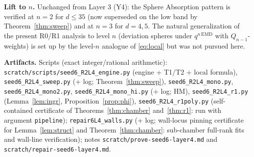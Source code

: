 \documentclass[11pt]{article}
\theoremstyle{definition}
\theoremstyle{remark}
\newcommand{\EMD}{\mathrm{EMD}}
\begin{document}
\textbf{Lift to $n$.} Unchanged from Layer 3 (Y4): the Sphere Absorption
pattern is verified at $n=2$ for $d\le35$ (now superseded on the low band by
Theorem~\ref{thm:sweep}) and at $n=3$ for $d=4,5$. The natural
generalization of the present R0/R1 analysis to level $n$ (deviation spheres
under $q^{n\,\EMD}$ with $Q_{n-1}$-weights) is set up by the level-$n$
analogue of \eqref{eq:local} but was not pursued here.

\medskip
\noindent\textbf{Artifacts.} Scripts (exact integer/rational arithmetic):
\texttt{scratch/scripts/seed6\_R2L4\_engine.py} (engine + T1/T2 + local
formula), \texttt{seed6\_R2L4\_sweep.py} (+ log; Theorem~\ref{thm:sweep}),
\texttt{seed6\_R2L4\_mono.py}, \texttt{seed6\_R2L4\_mono2.py},
\texttt{seed6\_R2L4\_mono\_hi.py} (+ log; HM),
\texttt{seed6\_R2L4\_r1.py} (Lemma~\ref{lem:ingr},
Proposition~\ref{prop:phi}),
\texttt{seed6\_R2L4\_r1poly.py} (self-contained certificate of
Theorems~\ref{thm:chamber} and~\ref{thm:r1}: run with argument
\texttt{pipeline}); \texttt{repair6L4\_walls.py} (+ log; wall-locus
pinning certificate for Lemma~\ref{lem:struct} and
Theorem~\ref{thm:chamber}: sub-chamber full-rank fits and wall-line
verification); notes \texttt{scratch/prove-seed6-layer4.md} and
\texttt{scratch/repair-seed6-layer4.md}.
\end{document}
